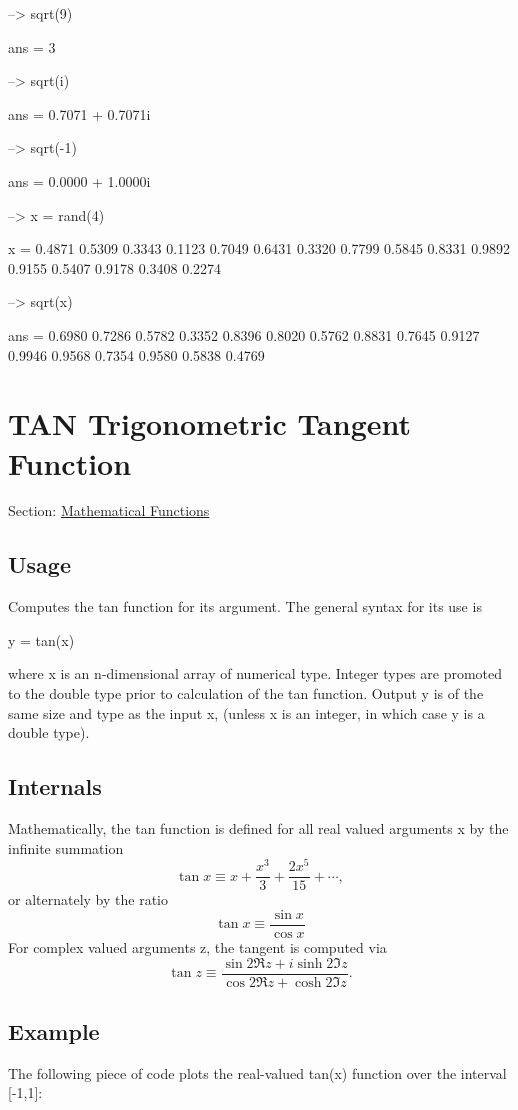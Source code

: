 \begin{DoxyVerbInclude}
--> sqrt(9)

ans = 
 3 

--> sqrt(i)

ans = 
   0.7071 +  0.7071i 

--> sqrt(-1)

ans = 
   0.0000 +  1.0000i 

--> x = rand(4)

x = 
    0.4871    0.5309    0.3343    0.1123 
    0.7049    0.6431    0.3320    0.7799 
    0.5845    0.8331    0.9892    0.9155 
    0.5407    0.9178    0.3408    0.2274 

--> sqrt(x)

ans = 
    0.6980    0.7286    0.5782    0.3352 
    0.8396    0.8020    0.5762    0.8831 
    0.7645    0.9127    0.9946    0.9568 
    0.7354    0.9580    0.5838    0.4769 
\end{DoxyVerbInclude}
 \hypertarget{mathfunctions_tan}{}\section{T\-A\-N Trigonometric Tangent Function}\label{mathfunctions_tan}
Section\-: \hyperlink{sec_mathfunctions}{Mathematical Functions} \hypertarget{vtkwidgets_vtkxyplotwidget_Usage}{}\subsection{Usage}\label{vtkwidgets_vtkxyplotwidget_Usage}
Computes the {\ttfamily tan} function for its argument. The general syntax for its use is \begin{DoxyVerb}  y = tan(x)
\end{DoxyVerb}
 where {\ttfamily x} is an {\ttfamily n}-\/dimensional array of numerical type. Integer types are promoted to the {\ttfamily double} type prior to calculation of the {\ttfamily tan} function. Output {\ttfamily y} is of the same size and type as the input {\ttfamily x}, (unless {\ttfamily x} is an integer, in which case {\ttfamily y} is a {\ttfamily double} type). \hypertarget{transforms_svd_Function}{}\subsection{Internals}\label{transforms_svd_Function}
Mathematically, the {\ttfamily tan} function is defined for all real valued arguments {\ttfamily x} by the infinite summation \[ \tan x \equiv x + \frac{x^3}{3} + \frac{2x^5}{15} + \cdots, \] or alternately by the ratio \[ \tan x \equiv \frac{\sin x}{\cos x} \] For complex valued arguments {\ttfamily z}, the tangent is computed via \[ \tan z \equiv \frac{\sin 2 \Re z + i \sinh 2 \Im z} {\cos 2 \Re z + \cosh 2 \Im z}. \] \hypertarget{variables_struct_Example}{}\subsection{Example}\label{variables_struct_Example}
The following piece of code plots the real-\/valued {\ttfamily tan(x)} function over the interval {\ttfamily \mbox{[}-\/1,1\mbox{]}}\-:


